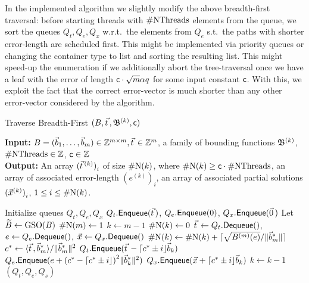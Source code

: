 In the implemented algorithm we slightly modify the above breadth-first traversal: before starting threads with $\mathrm{\#NThreads}$ elements from the queue, we sort the queues $Q_t, Q_e, Q_x$ w.r.t.\ the elements from $Q_e$ s.t.\ the paths with shorter error-length are scheduled first. This might be implemented via priority queues or changing the container type to list and sorting the resulting list. This might speed-up the enumeration if we additionally abort the tree-traversal once we have a leaf with the error of length $\mathsf{c} \cdot  \sqrt{m}\alpha q$ for some input constant $\mathsf{c}$. With this, we exploit the fact that the correct error-vector is much shorter than any other error-vector considered by the algorithm. 


%
%
\begin{algorithm}[h]
\caption{Traverse Breadth-First $(\BMat, \protect \tvec, \B^{(k)}, \const)$}
\label{alg:Breadth_first}
\textbf{Input:} $\BMat=(\bvec_1, \ldots, \bvec_m) \in \Z^{m \times m}, \tvec \in \Z^m$, a family of bounding functions $\mathfrak{B}^{(k)}$, $\mathrm{\#NThreads} \in {{\mathbb Z}}$, $\mathsf{c} \in {{\mathbb Z}}$ \\
\textbf{Output:} An array ${(\tvec^{(k)})}_i$ of size $\mathrm{\#N}(k)$, where $\mathrm{\#N}(k) \geq \mathsf{c} \cdot \mathrm{\#NThreads}$, an array of associated error-length ${(e^{(k)})}_i$, an array of associated partial solutions ${(\vec x^{(k)})}_i$, $1 \leq i \leq \mathrm{\#N}(k)$.
\begin{algorithmic}[1]
\State{} Initialize queues $Q_t, Q_e, Q_x$
\State{} $\Enq{Q_t}{\tvec}$, ${Q_e}.\mathsf{Enqueue}({0})$, $\Enq{Q_x}{\zerovec}$
\State{} Let $\widetilde{B}\gets\operatorname{GSO}(B)$
\State{} $\mathrm{\#N}(m) \gets 1$
\State{} $k \gets m-1$
    \State{} $\mathrm{\#N}(k) \gets 0$
        \State{} $\tvec \gets \Deq{Q_t}$, $e \gets {Q_e}.\mathsf{Dequeue}()$, $\vec x \gets {Q_x}.\mathsf{Dequeue}()$
        \State{} $\mathrm{\#N}(k) \gets \mathrm{\#N}(k)+ \lceil \sqrt{ B^{(m)}(e) } / \| \vec b^*_m \| \rceil $
        \State{} $c^{*} \gets \langle \tvec, \wbvec_m  \rangle / \|\wbvec_{m}\|^2$
            \State{} $\Enq{Q_t}{\tvec - \lceil c^{*} \pm  i \rfloor \bvec_k}$
            \State{} ${Q_e}.\mathsf{Enqueue}({e+{(c^{*} - \lceil c^{*} \pm  i \rfloor)}^2 \|\vec b^*_{k}\|^2})$
            \State{} ${Q_x}.\mathsf{Enqueue}({\vec x + \lceil c^{*} \pm  i \rfloor \vec b_k})$
        \EndFor{}
    \EndFor{}
    \State{} $k \gets k-1$
\EndWhile{}
\State{} \Return{} $(Q_t, Q_e, Q_s)$
\end{algorithmic}
\end{algorithm}